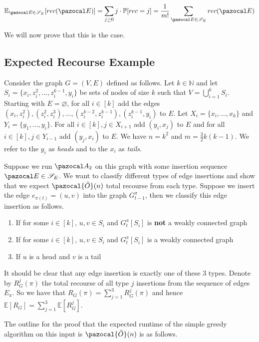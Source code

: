 \documentclass{article}
\begin{document}
\[ \mathbb{E}_{\pazocal E \in \mathcal{S}_{E}}[rec(\pazocal E)] = \sum_{j \geq 0} j \cdot \mathbb{P}[rec=j] = \frac{1}{m!} \sum_{\pazocal E \in \mathcal{S}_{E}}rec(\pazocal E) \]

We will now prove that this is the case.

\subsection{Expected Recourse Example}

Consider the graph $G=(V,E)$ defined as follows. Let $k \in \mathbb{N}$ and let $S_{i} = \{ x_{i}, z_{i}^{2}, ..., z_{i}^{k-1}, y_{i} \}$ be sets of nodes of size $k$ such that $V = \bigcup_{i=1}^{k}S_{i}$. Starting with $E= \varnothing$, for all $i \in [k]$ add the edges $(x_{i}, z_{i}^{2}), (z_{i}^{2}, z_{i}^{3}), ..., (z_{i}^{k-2}, z_{i}^{k-1}), (z_{i}^{k-1}, y_{i})$ to $E$. Let $X_{i}=\{x_{i},...,x_{k}\}$ and $Y_{i}=\{y_{1},...,y_{i}\}$. For all $i \in [k], j \in X_{i+1}$ add $(y_{i}, x_{j})$ to $E$ and for all $i \in [k], j \in Y_{i-1}$ add $(y_{j}, x_{i})$ to $E$. We have $n=k^2$ and $m=\frac{3}{2}k(k-1)$. We refer to the $y_{i}$ as \textit{heads} and to the $x_{i}$ as \textit{tails}.

Suppose we run $\pazocal A_2$ on this graph with some insertion sequence $\pazocal E \in \mathcal S_E$. We want to classify different types of edge insertions and show that we expect $\pazocal{\tilde{O}}(n)$ total recourse from each type. Suppose we insert the edge $e_{\pi(t)}=(u,v)$ into the graph $G_{t-1}^{\pi}$, then we classify this edge insertion as follows.

\begin{enumerate}[Type 1.]
    \item If for some $i \in [k]$, $u,v \in S_{i}$ and $G_{t}^{\pi}[S_{i}]$ is \textbf{not} a weakly connected graph
    \item If for some $i \in [k]$, $u,v \in S_{i}$ and $G_{t}^{\pi}[S_{i}]$ is a weakly connected graph
    \item If $u$ is a head and $v$ is a tail
\end{enumerate}

It should be clear that any edge insertion is exactly one of these 3 types. Denote by $R_{G}^{j}(\pi)$ the total recourse of all type $j$ insertions from the sequence of edges $E_{\pi}$. So we have that $R_{G}(\pi) = \sum_{j=1}^{3}R_{G}^{j}(\pi)$ and hence $\mathbb{E}[R_{G}] = \sum_{j=1}^{3}\mathbb{E}[R_{G}^{j}]$.

The outline for the proof that the expected runtime of the simple greedy algorithm on this input is $\pazocal{\tilde{O}}(n)$ is as follows.
\end{document}
